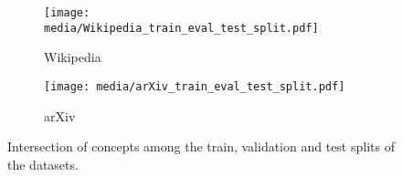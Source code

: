 \begin{figure}
    \centering
    \begin{subfigure}[t]{0.3\linewidth}
        \centering
        \texttt{[image: media/Wikipedia\_train\_eval\_test\_split.pdf]}
        \caption{Wikipedia}
    \end{subfigure}%
    \qquad\qquad
    \begin{subfigure}[t]{0.25\linewidth}
        \centering
        \texttt{[image: media/arXiv\_train\_eval\_test\_split.pdf]}
        \caption{arXiv}
    \end{subfigure}
    \caption{Intersection of concepts among the train, validation and test splits of the datasets.}
    \label{fig:dataset-overlap}
\end{figure}
